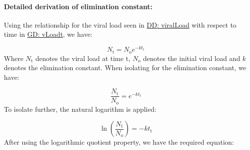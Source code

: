 \documentclass[12pt]{article}
\begin{document}
\paragraph{Detailed derivation of elimination constant:}
\label{IM:calofElimConstDeriv}
Using the relationship for the viral load seen in \hyperref[DD:viralLoad]{DD: viralLoad} with respect to time in \hyperref[GD:vLoadt]{GD: vLoadt}, we have:

\begin{displaymath}
{N_{\text{t}}}={N_{\text{o}}} e^{-k {t_{\text{t}}}}
\end{displaymath}
Where ${N_{\text{t}}}$ denotes the viral load at time t, ${N_{\text{o}}}$ denotes the initial viral load and $k$ denotes the elimination constant. When isolating for the elimination constant,  we have:

\begin{displaymath}
\frac{{N_{\text{t}}}}{{N_{\text{o}}}}=e^{-k {t_{\text{t}}}}
\end{displaymath}
To isolate further, the natural logarithm is applied:

\begin{displaymath}
\ln\left(\frac{{N_{\text{t}}}}{{N_{\text{o}}}}\right)=-k {t_{\text{t}}}
\end{displaymath}
After using the logarithmic quotient property, we have the required equation:
\end{document}
